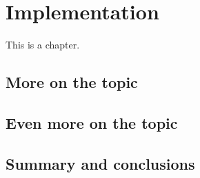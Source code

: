 
\chapter{Implementation}

This is a chapter.

\blah

\blah

\blah

\section{More on the topic}

\blah

\blah

\section{Even more on the topic}

\blah

\blah

\section{Summary and conclusions}

\blah
